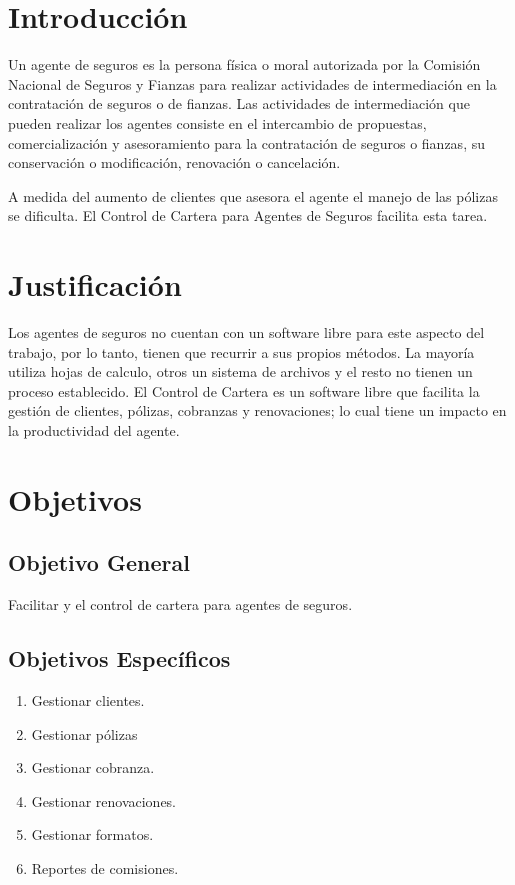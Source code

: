 \setcounter{page}{1}
\tableofcontents

\section{Introducción}%
Un agente de seguros es la persona física o moral autorizada por la Comisión Nacional de Seguros y Fianzas para realizar actividades de intermediación en la contratación de seguros o de fianzas. Las actividades de intermediación que pueden realizar los agentes consiste en el intercambio de propuestas, comercialización y asesoramiento para la contratación de seguros o fianzas, su conservación o modificación, renovación o cancelación. \cite{www:reg-agentes}

A medida del aumento de clientes que asesora el agente el manejo de las pólizas se dificulta.
El Control de Cartera para Agentes de Seguros facilita esta tarea.

\section{Justificación}

Los agentes de seguros no cuentan con un software libre para este aspecto del trabajo, por lo tanto, tienen que recurrir a sus propios métodos. La mayoría utiliza hojas de calculo, otros un sistema de archivos y el resto no tienen 
un proceso establecido.
El Control de Cartera es un software libre que facilita la gestión de clientes, pólizas, cobranzas y renovaciones; lo cual tiene un impacto en la productividad del agente.

\section{Objetivos}
\subsection*{Objetivo General}
Facilitar y el control de cartera para agentes de seguros.
\subsection*{Objetivos Específicos}
\begin{enumerate}
  \item Gestionar clientes.
  \item Gestionar pólizas
  \item Gestionar cobranza.
  \item Gestionar renovaciones.
  \item Gestionar formatos.
  \item Reportes de comisiones.
\end{enumerate}

